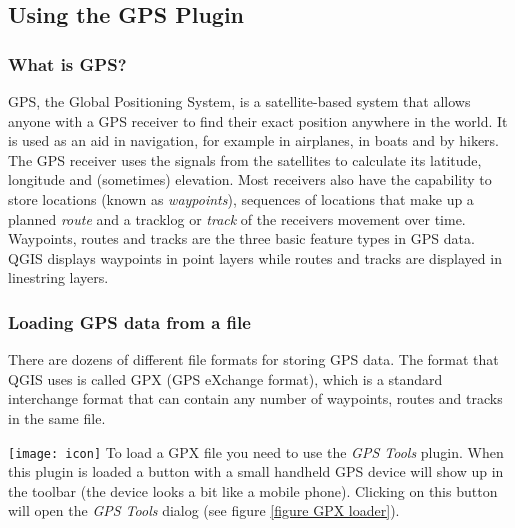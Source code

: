 \subsection{Using the GPS Plugin}\label{label_plugingps}

\subsubsection{What is GPS?}\label{whatsgps}

GPS, the Global Positioning System, is a satellite-based system that
allows anyone with a GPS receiver to find their exact position anywhere
in the world. It is used as an aid in navigation, for example in airplanes,
in boats and by hikers. The GPS receiver uses the signals from the
satellites to calculate its latitude, longitude and (sometimes) elevation.
Most receivers also have the capability to store locations (known
as \emph{waypoints}), sequences of locations that make up a planned
\emph{route} and a tracklog or \emph{track} of the receivers movement
over time. Waypoints, routes and tracks are the three basic feature
types in GPS data. QGIS displays waypoints in point layers while routes
and tracks are displayed in linestring layers.

\subsubsection{Loading GPS data from a file}\label{label_loadgps}

There are dozens of different file formats for storing GPS data. The
format that QGIS uses is called GPX (GPS eXchange format), which is
a standard interchange format that can contain any number of waypoints,
routes and tracks in the same file.

\texttt{[image: icon]} To load a GPX file you need to use the
\emph{GPS
Tools} plugin. When this plugin is loaded a button with a small handheld GPS
device will show up in the toolbar (the device looks a bit like a mobile
phone). Clicking on this button will open the \emph{GPS Tools} dialog (see
figure \ref{figure GPX loader}).


